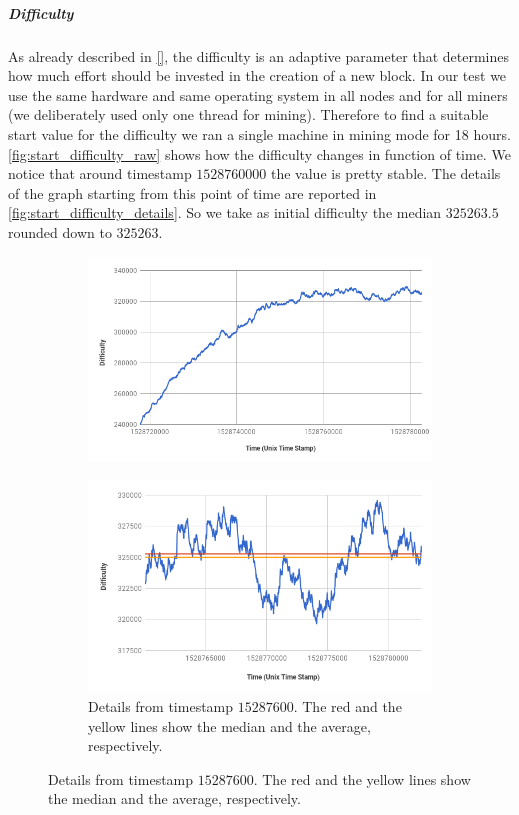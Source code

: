 \subparagraph{Difficulty}
As already described in \autoref{}, the difficulty is an adaptive parameter 
that determines how much effort should be invested in the creation of a new
block.
In our test we use the same hardware and same operating system in all nodes
and for all miners (we deliberately used only one thread for mining).
Therefore to find a suitable start value for the difficulty we ran a
single machine in mining mode for 18 hours. \autoref{fig:start_difficulty_raw}
shows how the difficulty changes in function of time.
We notice that around timestamp $1528760000$ the value is pretty stable.
The details of the graph starting from this point of time are reported
in \autoref{fig:start_difficulty_details}.
So we take as initial difficulty the median $325263.5$ rounded down
to $325263$.
\begin{figure}
	\begin{center}
	\begin{subfigure}{.48\textwidth}
		\includegraphics[width=\textwidth]{./res/img/start_difficulty.png}
	
		\caption{}
		\label{fig:start_difficulty_raw}
		
	\end{subfigure}
	\begin{subfigure}{.48\textwidth}
		\includegraphics[width=\textwidth]{./res/img/start_difficulty_details.png}
		\caption{Details from timestamp $15287600$. The red and the
			yellow lines show the median and the average, respectively.}
		\label{fig:start_difficulty_details}
	\end{subfigure}
	

\end{center}
\end{figure}
